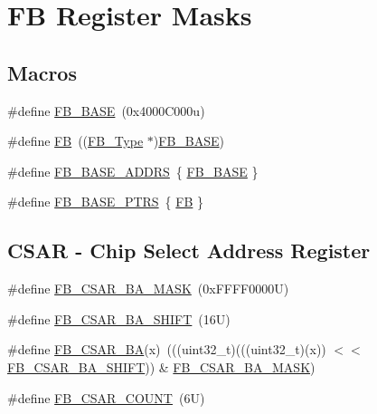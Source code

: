 \hypertarget{group___f_b___register___masks}{}\section{FB Register Masks}
\label{group___f_b___register___masks}
\subsection*{Macros}
\begin{DoxyCompactItemize}
\item 
\#define \mbox{\hyperlink{group___f_b___register___masks_ga0d4d1f953f53702b3ffbbc10fb7ec30d}{F\+B\+\_\+\+B\+A\+SE}}~(0x4000\+C000u)
\item 
\#define \mbox{\hyperlink{group___f_b___register___masks_gafa56f653aa38688ca538ba26fcde993c}{FB}}~((\mbox{\hyperlink{struct_f_b___type}{F\+B\+\_\+\+Type}} $\ast$)\mbox{\hyperlink{group___f_b___register___masks_ga0d4d1f953f53702b3ffbbc10fb7ec30d}{F\+B\+\_\+\+B\+A\+SE}})
\item 
\#define \mbox{\hyperlink{group___f_b___register___masks_gaaf7a0f4fce443d227db43982f175a3fb}{F\+B\+\_\+\+B\+A\+S\+E\+\_\+\+A\+D\+D\+RS}}~\{ \mbox{\hyperlink{group___f_b___register___masks_ga0d4d1f953f53702b3ffbbc10fb7ec30d}{F\+B\+\_\+\+B\+A\+SE}} \}
\item 
\#define \mbox{\hyperlink{group___f_b___register___masks_ga0aa36a3189de1e68b58234782768941a}{F\+B\+\_\+\+B\+A\+S\+E\+\_\+\+P\+T\+RS}}~\{ \mbox{\hyperlink{group___f_b___register___masks_gafa56f653aa38688ca538ba26fcde993c}{FB}} \}
\end{DoxyCompactItemize}
\subsection*{C\+S\+AR -\/ Chip Select Address Register}
\begin{DoxyCompactItemize}
\item 
\#define \mbox{\hyperlink{group___f_b___register___masks_ga917335c957f6472faf91ae0b244db487}{F\+B\+\_\+\+C\+S\+A\+R\+\_\+\+B\+A\+\_\+\+M\+A\+SK}}~(0x\+F\+F\+F\+F0000\+U)
\item 
\#define \mbox{\hyperlink{group___f_b___register___masks_ga098f6109a1dcc8cc007bca53c312810f}{F\+B\+\_\+\+C\+S\+A\+R\+\_\+\+B\+A\+\_\+\+S\+H\+I\+FT}}~(16\+U)
\item 
\#define \mbox{\hyperlink{group___f_b___register___masks_ga711f226d59ad769fe5112524c7dc7b66}{F\+B\+\_\+\+C\+S\+A\+R\+\_\+\+BA}}(x)~(((uint32\+\_\+t)(((uint32\+\_\+t)(x)) $<$$<$ \mbox{\hyperlink{group___f_b___register___masks_ga098f6109a1dcc8cc007bca53c312810f}{F\+B\+\_\+\+C\+S\+A\+R\+\_\+\+B\+A\+\_\+\+S\+H\+I\+FT}})) \& \mbox{\hyperlink{group___f_b___register___masks_ga917335c957f6472faf91ae0b244db487}{F\+B\+\_\+\+C\+S\+A\+R\+\_\+\+B\+A\+\_\+\+M\+A\+SK}})
\item 
\#define \mbox{\hyperlink{group___f_b___register___masks_gaf434a36fdfbada5626b96348a75fdd8a}{F\+B\+\_\+\+C\+S\+A\+R\+\_\+\+C\+O\+U\+NT}}~(6\+U)
\end{DoxyCompactItemize}
